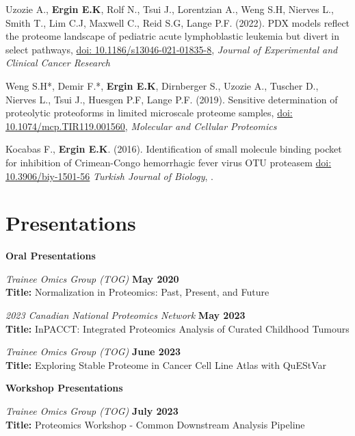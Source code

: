 \documentclass[margin,line]{res}
\begin{document}
\begin{resume}
Uzozie A., {\bf Ergin E.K}, Rolf N., Tsui J., Lorentzian A., Weng S.H,  Nierves L., Smith T., Lim C.J,  Maxwell C., Reid S.G, Lange P.F. (2022). PDX models reflect the proteome landscape of pediatric acute lymphoblastic leukemia but divert in select pathways, \href{https://dx.doi.org/10.1186%2Fs13046-021-01835-8}{doi: 10.1186/s13046-021-01835-8}, {\em Journal of Experimental and Clinical Cancer Research}

Weng S.H*, Demir F.*, {\bf Ergin E.K}, Dirnberger S., Uzozie A., Tuscher D., Nierves L., Tsui J., Huesgen P.F, Lange P.F. (2019). Sensitive determination of proteolytic proteoforms in limited microscale proteome samples, \href{https://doi.org/10.1074/mcp.TIR119.001560}{doi: 10.1074/mcp.TIR119.001560}, {\em Molecular and Cellular Proteomics}

Kocabas F., {\bf Ergin E.K}. (2016). Identification of small molecule binding pocket for inhibition of Crimean-Congo hemorrhagic fever virus OTU proteasem \href{https://www.researchgate.net/profile/Fatih_Kocabas/publication/284188739_Identification_of_small_molecule_binding_pocket_for_inhibition_of_Crimean-Congo_hemorrhagic_fever_virus_OTU_protease/links/564f6a0b08aefe619b11de98.pdf}{doi: 10.3906/biy-1501-56} {\em Turkish Journal of Biology}, .


\section{\sc Presentations}
{\bf Oral Presentations}

\vspace{-.3cm}
{\em Trainee Omics Group (TOG)} \hfill {\bf May 2020}\\
{\bf Title:} Normalization in Proteomics: Past, Present, and Future

{\em 2023 Canadian National Proteomics Network} \hfill {\bf May 2023}\\
{\bf Title:} InPACCT: Integrated Proteomics Analysis of Curated Childhood Tumours

{\em Trainee Omics Group (TOG)} \hfill {\bf June 2023}\\
{\bf Title:} Exploring Stable Proteome in Cancer Cell Line Atlas with QuEStVar

{\bf Workshop Presentations}

\vspace{-.3cm}
{\em Trainee Omics Group (TOG)} \hfill {\bf July 2023}\\
{\bf Title:} Proteomics Workshop - Common Downstream Analysis Pipeline


\end{resume}
\end{document}
